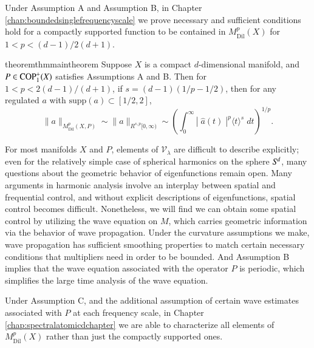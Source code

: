 Under Assumption A and Assumption B, in Chapter \ref{chap:boundedsinglefrequencyscale} we prove necessary and sufficient conditions hold for a compactly supported function to be contained in $M^p_{\text{Dil}}(X)$ for $1 < p < (d-1)/2(d+1)$.

\begin{restatable}{theorem}{thmmaintheorem} \label{maintheorem}
  Suppose $X$ is a compact $d$-dimensional manifold, and $P \in {\text{COP}^{+}_{{1}}}(X)$ satisfies Assumptions A and B. Then for $1 < p < 2(d-1)/(d+1)$, if $s = (d-1)(1/p - 1/2)$, then for any regulated $a$ with $\text{supp}(a) \subset [1/2,2]$,
  \[ \| a \|_{M^p_{\text{Dil}}(X,P)} \sim \| a \|_{R^{s,p}[0,\infty)} \sim \left( \int_0^\infty |\;\!\widehat{a}(t)\;\!|^p \langle t \rangle^s\; dt \right)^{1/p}. \]
\end{restatable}

For most manifolds $X$ and $P$, elements of $\mathcal{V}_\lambda$ are difficult to describe explicitly; even for the relatively simple case of spherical harmonics on the sphere ${S}^{\!{d}}$, many questions about the geometric behavior of eigenfunctions remain open. Many arguments in harmonic analysis involve an interplay between spatial and frequential control, and without explicit descriptions of eigenfunctions, spatial control becomes difficult. Nonetheless, we will find we can obtain some spatial control by utilizing the wave equation on $M$, which carries geometric information via the behavior of wave propagation. Under the curvature assumptions we make, wave propagation has sufficient smoothing properties to match certain necessary conditions that multipliers need in order to be bounded. And Assumption B implies that the wave equation associated with the operator $P$ is periodic, which simplifies the large time analysis of the wave equation.

Under Assumption C, and the additional assumption of certain wave estimates associated with $P$ at each frequency scale, in Chapter \ref{chap:spectralatomicdchapter} we are able to characterize all elements of $M^p_{\text{Dil}}(X)$ rather than just the compactly supported ones.


